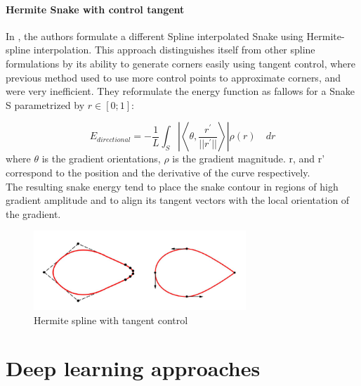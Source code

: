 \documentclass[main.tex]{subfiles}
\begin{document}
\paragraph{Hermite Snake with control tangent} In \cite{Uhlmann2016}, the authors formulate a different Spline interpolated Snake using Hermite-spline interpolation. This approach distinguishes itself from other spline formulations by its ability to generate corners easily using tangent control, where previous method used to use more control points to approximate corners, and were very inefficient. They reformulate the energy function as fallows for a Snake S parametrized by $r \in [0;1]$:

\begin{equation}
    E_{\mathit{directional}} = -\frac{1}{L} \int_{S}\left| \left< \theta, \frac{r^{'}}{||r^{'}||}\right>\right| \rho(r) \quad dr
\end{equation}
where $\theta$ is the gradient orientations, $\rho$ is the gradient magnitude. r, and r' correspond to the position and the derivative of the curve respectively.\\

The resulting snake energy tend to place the snake contour in regions of high gradient amplitude  and to align its tangent vectors with the local orientation of the gradient.

\begin{figure}[H]
    \centering
    \includegraphics[width=8cm]{images/hermite.PNG}
    \caption{Hermite spline with tangent control}
    \label{fig:ac}
\end{figure}


\section{Deep learning approaches}
\end{document}

